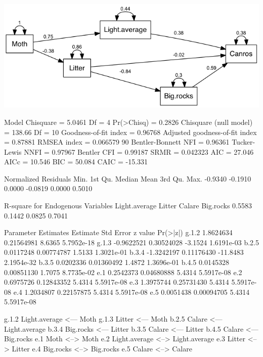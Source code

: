 \documentclass[12pt]{article}
\begin{document}
\includegraphics{semPathCanros.png}
\pagebreak

\begin{Schunk}
\begin{Soutput}
 Model Chisquare =  5.0461   Df =  4 Pr(>Chisq) = 0.2826
 Chisquare (null model) =  138.66   Df =  10
 Goodness-of-fit index =  0.96768
 Adjusted goodness-of-fit index =  0.87881
 RMSEA index =  0.066579   90%
 Bentler-Bonnett NFI =  0.96361
 Tucker-Lewis NNFI =  0.97967
 Bentler CFI =  0.99187
 SRMR =  0.042323
 AIC =  27.046
 AICc =  10.546
 BIC =  50.084
 CAIC =  -15.331

 Normalized Residuals
   Min. 1st Qu.  Median    Mean 3rd Qu.    Max. 
-0.9340 -0.1910  0.0000 -0.0819  0.0000  0.5010 

 R-square for Endogenous Variables
Light.average        Litter        Calare     Big.rocks 
       0.5583        0.1442        0.0825        0.7041 

 Parameter Estimates
      Estimate   Std Error  z value  Pr(>|z|)  
g.1.2  1.8624634 0.21564981   8.6365 5.7952e-18
g.1.3 -0.9622521 0.30524028  -3.1524 1.6191e-03
b.2.5  0.0117248 0.00774787   1.5133 1.3021e-01
b.3.4 -1.3242197 0.11176430 -11.8483 2.1954e-32
b.3.5  0.0202336 0.01360492   1.4872 1.3696e-01
b.4.5  0.0145328 0.00851130   1.7075 8.7735e-02
e.1    0.2542373 0.04680888   5.4314 5.5917e-08
e.2    0.6975726 0.12843352   5.4314 5.5917e-08
e.3    1.3975744 0.25731430   5.4314 5.5917e-08
e.4    1.2034807 0.22157875   5.4314 5.5917e-08
e.5    0.0051438 0.00094705   5.4314 5.5917e-08
                                      
g.1.2 Light.average <--- Moth         
g.1.3 Litter <--- Moth                
b.2.5 Calare <--- Light.average       
b.3.4 Big.rocks <--- Litter           
b.3.5 Calare <--- Litter              
b.4.5 Calare <--- Big.rocks           
e.1   Moth <--> Moth                  
e.2   Light.average <--> Light.average
e.3   Litter <--> Litter              
e.4   Big.rocks <--> Big.rocks        
e.5   Calare <--> Calare              


\end{Soutput}
\end{Schunk}
\end{document}
